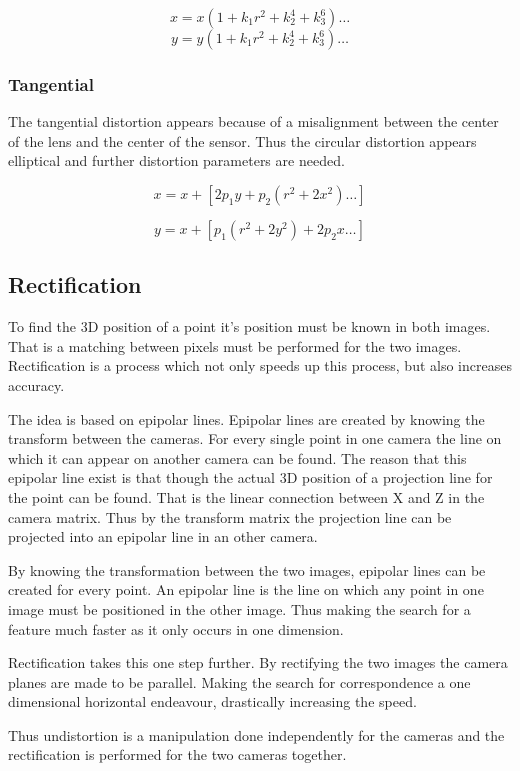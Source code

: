 \[x = x(1 + k_{1} r^{2} + k_{2}^{4} + k_{3}^{6} ) \ldots \] 
\[y = y(1 + k_{1} r^{2} + k_{2}^{4} + k_{3}^{6} ) \ldots \]


\subsubsection{Tangential}

The tangential distortion appears because of a misalignment between the center of the lens and the center of the sensor. Thus the circular distortion appears elliptical and further distortion parameters are needed.

\[x = x + [2p_{1}y + p_{2}(r^{2} + 2x^{2} ) \ldots  ] \] 

\[y = x + [p_{1}(r^{2} + 2y^{2} ) + 2p_{2}x \ldots ] \] 

\subsection{Rectification}

To find the 3D position of a point it's position must be known in both images. That is a matching between pixels must be performed for the two images. Rectification is a process which not only speeds up this process, but also increases accuracy.

The idea is based on epipolar lines. Epipolar lines are created by knowing the transform between the cameras. For every single point in one camera the line on which it can appear on another camera can be found. The reason that this epipolar line exist is that though the actual 3D position of a projection line for the point can be found. That is the linear connection between X and Z in the camera matrix. Thus by the transform matrix the projection line can be projected into an epipolar line in an other camera.  

By knowing the transformation between the two images, epipolar lines can be created for every point. An epipolar line is the line on which any point in one image must be positioned in the other image. Thus making the search for a feature much faster as it only occurs in one dimension.

Rectification takes this one step further. By rectifying the two images the camera planes are made to be parallel. Making the search for correspondence a one dimensional horizontal endeavour, drastically increasing the speed.

Thus undistortion is a manipulation done independently for the cameras and the rectification is performed for the two cameras together.

